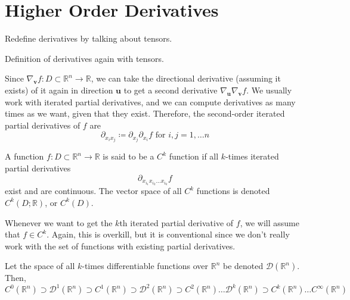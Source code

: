 \section{Higher Order Derivatives} 

  Redefine derivatives by talking about tensors. 

  \begin{definition}
    Definition of derivatives again with tensors. 
  \end{definition}

  Since $\nabla_\mathbf{v} f: D \subset \mathbb{R}^n \longrightarrow \mathbb{R}$, we can take the directional derivative (assuming it exists) of it again in direction $\mathbf{u}$ to get a second derivative $\nabla_\mathbf{u} \nabla_\mathbf{v} f$. We usually work with iterated partial derivatives, and we can compute derivatives as many times as we want, given that they exist. Therefore, the second-order iterated partial derivatives of $f$ are 
  \[\partial_{x_i x_j} \coloneqq \partial_{x_j} \partial_{x_i} f \text{ for } i, j = 1, \ldots n\]

  \begin{definition}[$C^k$ Functions]
  A function $f: D \subset \mathbb{R}^n \longrightarrow \mathbb{R}$ is said to be a $C^k$ function if all $k$-times iterated partial derivatives 
  \[\partial_{x_{i_1} x_{i_2} \ldots x_{i_k}} f\]
  exist and are continuous. The vector space of all $C^k$ functions is denoted $C^k (D; \mathbb{R})$, or $C^k(D)$. 
  \end{definition}

  Whenever we want to get the $k$th iterated partial derivative of $f$, we will assume that $f \in C^k$. Again, this is overkill, but it is conventional since we don't really work with the set of functions with existing partial derivatives. 

  \begin{theorem}
  Let the space of all $k$-times differentiable functions over $\mathbb{R}^n$ be denoted $\mathcal{D}(\mathbb{R}^n)$. Then, 
  \[C^0(\mathbb{R}^n) \supset \mathcal{D}^1 (\mathbb{R}^n) \supset C^1 (\mathbb{R}^n) \supset \mathcal{D}^2 (\mathbb{R}^n) \supset C^2 (\mathbb{R}^n) \ldots \mathcal{D}^k (\mathbb{R}^n) \supset C^k (\mathbb{R}^n) \ldots C^\infty (\mathbb{R}^n) \]
  \end{theorem}

